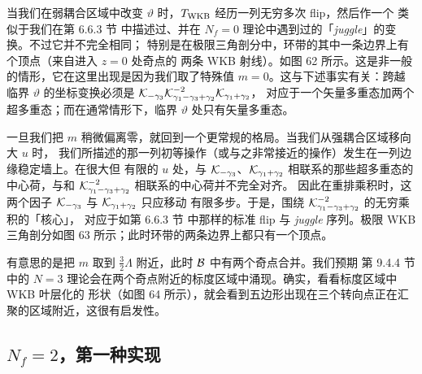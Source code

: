 当我们在弱耦合区域中改变 $\vartheta$ 时，$T_{\rm WKB}$ 经历一列无穷多次 flip，然后作一个
类似于我们在第 6.6.3 节%
中描述过、并在 $N_f = 0$ 理论中遇到过的「\emph{juggle}」的变换。不过它并不完全相同；
特别是在极限三角剖分中，环带的其中一条边界上有  个顶点（来自进入 $z=0$ 处奇点的
两条 WKB 射线）。如图 62%
所示。这是非一般的情形，它在这里出现是因为我们取了特殊值 $m=0$。这与下述事实有关：跨越
临界 $\vartheta$ 的坐标变换必须是
$\mathcal{K}_{-\gamma_3} \mathcal{K}_{\gamma_1-\gamma_3+ \gamma_2}^{-2} \mathcal{K}_{\gamma_1+\gamma_2}$，
对应于一个矢量多重态加两个超多重态；而在通常情形下，临界 $\vartheta$ 处只有矢量多重态。



一旦我们把 $m$ 稍微偏离零，就回到一个更常规的格局。当我们从强耦合区域移向大 $u$ 时，
我们所描述的那一列初等操作（或与之非常接近的操作）发生在一列边缘稳定墙上。在很大但
有限的 $u$ 处，与 $\mathcal{K}_{-\gamma_3}$、$\mathcal{K}_{\gamma_1+\gamma_2}$ 相联系的那些超多重态的
中心荷，与和 $\mathcal{K}_{\gamma_1-\gamma_3+ \gamma_2}^{-2}$ 相联系的中心荷并不完全对齐。
因此在重排乘积时，这两个因子 $\mathcal{K}_{-\gamma_3}$ 与 $\mathcal{K}_{\gamma_1+\gamma_2}$ 只应移动
有限多步。于是，围绕 $\mathcal{K}_{\gamma_1-\gamma_3+ \gamma_2}^{-2}$ 的无穷乘积的「核心」，
对应于如第 6.6.3 节%
中那样的标准 flip 与 \emph{juggle} 序列。极限 WKB 三角剖分如图 63%
所示；此时环带的两条边界上都只有一个顶点。

有意思的是把 $m$ 取到 $\frac{3}{2} \Lambda$ 附近，此时 $\mathcal{B}$ 中有两个奇点合并。我们预期
第 9.4.4 节%
中的 $N=3$ 理论会在两个奇点附近的标度区域中涌现。确实，看看标度区域中 WKB 叶层化的
形状（如图 64%
所示），就会看到五边形出现在三个转向点正在汇聚的区域附近，这很有启发性。


\subsection{$N_f=2$，第一种实现}

